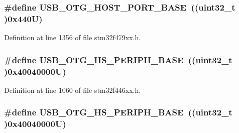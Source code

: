 \subsubsection[{\texorpdfstring{U\+S\+B\+\_\+\+O\+T\+G\+\_\+\+H\+O\+S\+T\+\_\+\+P\+O\+R\+T\+\_\+\+B\+A\+SE}{USB_OTG_HOST_PORT_BASE}}]{\setlength{\rightskip}{0pt plus 5cm}\#define U\+S\+B\+\_\+\+O\+T\+G\+\_\+\+H\+O\+S\+T\+\_\+\+P\+O\+R\+T\+\_\+\+B\+A\+SE~((uint32\+\_\+t )0x440\+U)}\hypertarget{group___peripheral__memory__map_ga42f433cb79ca69f09972e690fda6737a}{}\label{group___peripheral__memory__map_ga42f433cb79ca69f09972e690fda6737a}


Definition at line 1356 of file stm32f479xx.\+h.

\subsubsection[{\texorpdfstring{U\+S\+B\+\_\+\+O\+T\+G\+\_\+\+H\+S\+\_\+\+P\+E\+R\+I\+P\+H\+\_\+\+B\+A\+SE}{USB_OTG_HS_PERIPH_BASE}}]{\setlength{\rightskip}{0pt plus 5cm}\#define U\+S\+B\+\_\+\+O\+T\+G\+\_\+\+H\+S\+\_\+\+P\+E\+R\+I\+P\+H\+\_\+\+B\+A\+SE~((uint32\+\_\+t )0x40040000\+U)}\hypertarget{group___peripheral__memory__map_gaa405d2ebfd7e9394237b6639f16a5409}{}\label{group___peripheral__memory__map_gaa405d2ebfd7e9394237b6639f16a5409}


Definition at line 1060 of file stm32f446xx.\+h.

\subsubsection[{\texorpdfstring{U\+S\+B\+\_\+\+O\+T\+G\+\_\+\+H\+S\+\_\+\+P\+E\+R\+I\+P\+H\+\_\+\+B\+A\+SE}{USB_OTG_HS_PERIPH_BASE}}]{\setlength{\rightskip}{0pt plus 5cm}\#define U\+S\+B\+\_\+\+O\+T\+G\+\_\+\+H\+S\+\_\+\+P\+E\+R\+I\+P\+H\+\_\+\+B\+A\+SE~((uint32\+\_\+t )0x40040000\+U)}\hypertarget{group___peripheral__memory__map_gaa405d2ebfd7e9394237b6639f16a5409}{}\label{group___peripheral__memory__map_gaa405d2ebfd7e9394237b6639f16a5409}


